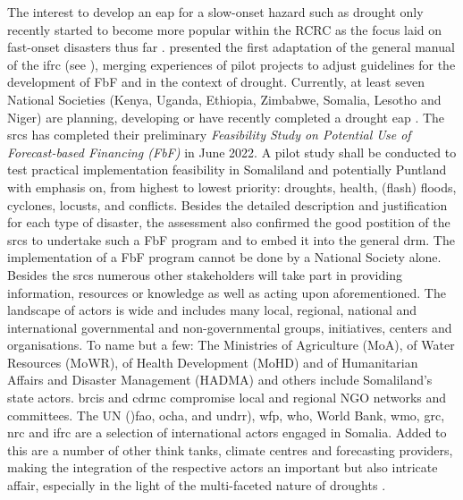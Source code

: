 The interest to develop an \acrshort{eap} for a slow-onset hazard such as drought only recently started to become more popular within the RCRC as the focus laid on fast-onset disasters thus far \autocite{rcrcFORECASTBASEDFINANCINGEARLY2020}. \autocite{rcrcFORECASTBASEDFINANCINGEARLY2020} presented the first adaptation of the general manual of the \acrshort{ifrc} (see \autocite{ifrcFbFPractitionersManual2023b}), merging experiences of pilot projects to adjust guidelines for the development of FbF and  in the context of drought. Currently, at least seven National Societies (Kenya, Uganda, Ethiopia, Zimbabwe, Somalia, Lesotho and Niger) are planning, developing or have recently completed a drought \acrshort{eap} \autocite{lesothoredcrosssocietyEARLYACTIONPROTOCOL2022,nigerredcrosssocietyNigerDroughtEarly2021,rcrcFORECASTBASEDFINANCINGEARLY2020}.\newline
The \acrfull{srcs} has completed their preliminary \textit{Feasibility Study on Potential Use of Forecast-based Financing (FbF)} in June 2022. A pilot study shall be conducted to test practical implementation feasibility in Somaliland and potentially Puntland with emphasis on, from highest to lowest priority: droughts, health, (flash) floods, cyclones, locusts, and conflicts. Besides the detailed description and justification for each type of disaster, the assessment also confirmed the good postition of the \acrshort{srcs} to undertake such a FbF program and to embed it into the general \acrlong{drm}.\newline
The implementation of a FbF program cannot be done by a National Society alone. Besides the \acrshort{srcs} numerous other stakeholders will take part in providing information, resources or knowledge as well as acting upon aforementioned. The landscape of actors is wide and includes many local, regional, national and international governmental and non-governmental groups, initiatives, centers and organisations. To name but a few: The Ministries of Agriculture (MoA), of Water Resources (MoWR), of Health Development (MoHD) and of Humanitarian Affairs and Disaster Management (HADMA) and others include Somaliland's state actors. \acrfull{brcis} and \acrfull{cdrmc} compromise local and regional NGO networks and committees. The UN ()\acrshort{fao}, \acrshort{ocha}, and \acrshort{undrr}), \acrshort{wfp}, \acrshort{who}, World Bank, \acrshort{wmo}, \acrshort{grc}, \acrshort{nrc} and \acrshort{ifrc} are a selection of international actors engaged in Somalia. Added to this are a number of other think tanks, climate centres and forecasting providers, making the integration of the respective actors an important but also intricate affair, especially in the light of the multi-faceted nature of droughts \autocite{rcrcFORECASTBASEDFINANCINGEARLY2020,somaliredcrescentsocietyFeasibilityStudyPotential2022}.

